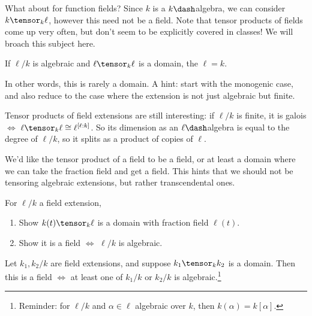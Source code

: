 What about for function fields? Since \(k\) is a \(k\dash\)algebra, we
can consider \(k\tensor_k \ell\), however this need not be a field. Note
that tensor products of fields come up very often, but don't seem to be
explicitly covered in classes! We will broach this subject here.

\begin{exercise}

If \(\ell/k\) is algebraic and \(\ell\tensor_k \ell\) is a domain, the
\(\ell = k\).

\end{exercise}

\begin{remark}

In other words, this is rarely a domain. A hint: start with the
monogenic case, and also reduce to the case where the extension is not
just algebraic but finite.

\end{remark}

\begin{remark}

Tensor products of field extensions are still interesting: if \(\ell/k\)
is finite, it is galois \(\iff\)
\(\ell \tensor_k \ell \cong \ell^{[\ell: k]}\). So its dimension as an
\(\ell\dash\)algebra is equal to the degree of \(\ell/k\), so it splits
as a product of copies of \(\ell\).

We'd like the tensor product of a field to be a field, or at least a
domain where we can take the fraction field and get a field. This hints
that we should not be tensoring algebraic extensions, but rather
transcendental ones.

\end{remark}

\begin{exercise}

For \(\ell/k\) a field extension,

\begin{enumerate}
\def\labelenumi{\alph{enumi}.}
\item
  Show \(k(t) \tensor_k \ell\) is a domain with fraction field
  \(\ell(t)\).
\item
  Show it is a field \(\iff\) \(\ell/k\) is algebraic.
\end{enumerate}

\end{exercise}

\begin{proposition}[FT 12.7, 12.8]

Let \(k_1, k_2 / k\) are field extensions, and suppose
\(k_1 \tensor_k k_2\) is a domain. Then this is a field \(\iff\) at
least one of \(k_1/k\) or \(k_2/k\) is algebraic.\footnote{Reminder: for
  \(\ell/k\) and \(\alpha\in \ell\) algebraic over \(k\), then
  \(k(\alpha) = k[\alpha]\).}

\end{proposition}

